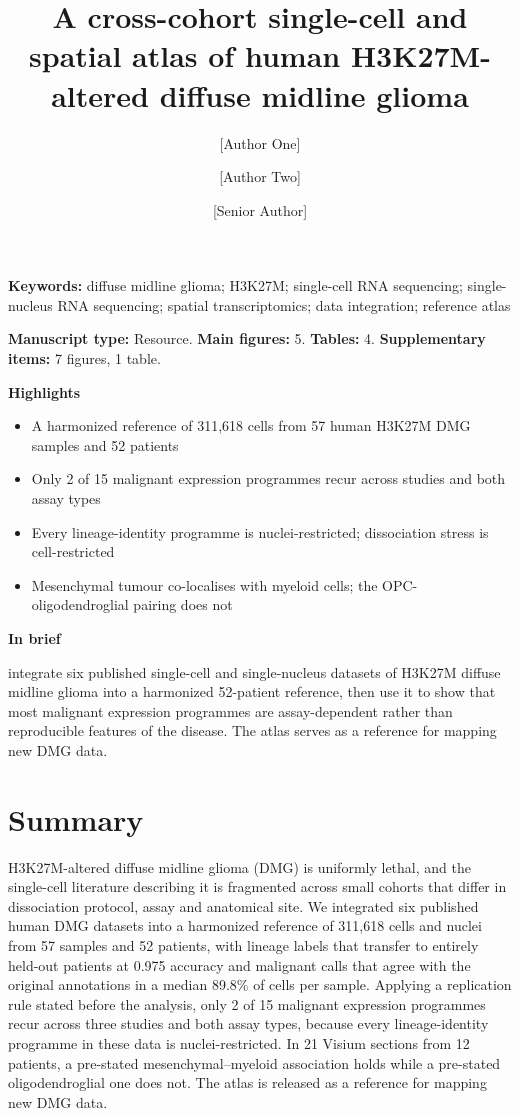 \documentclass[12pt,a4paper]{article}
\title{\bfseries A cross-cohort single-cell and spatial atlas of human H3K27M-altered diffuse midline glioma}
\author[1]{[Author One]}
\author[1,2]{[Author Two]}
\author[1,*]{[Senior Author]}
\affil[1]{[Department, Institution, City, Country]}
\affil[2]{[Second affiliation]}
\affil[*]{Correspondence: [email]}
\date{}
\begin{document}
\sloppy
\maketitle
\thispagestyle{empty}

\noindent\textbf{Keywords:} diffuse midline glioma; H3K27M; single-cell RNA sequencing; single-nucleus RNA
sequencing; spatial transcriptomics; data integration; reference atlas

\vspace{1em}
\noindent\textbf{Manuscript type:} Resource. \quad \textbf{Main figures:} 5. \quad \textbf{Tables:} 4. \quad
\textbf{Supplementary items:} 7 figures, 1 table.

\vspace{1.2em}
\noindent\textbf{Highlights}
\begin{itemize}\setlength\itemsep{0.1em}
  \item A harmonized reference of 311,618 cells from 57 human H3K27M DMG samples and 52 patients
  \item Only 2 of 15 malignant expression programmes recur across studies and both assay types
  \item Every lineage-identity programme is nuclei-restricted; dissociation stress is cell-restricted
  \item Mesenchymal tumour co-localises with myeloid cells; the OPC-oligodendroglial pairing does not
\end{itemize}

\vspace{0.6em}
\noindent\textbf{In brief}

\noindent [Authors] integrate six published single-cell and single-nucleus datasets of H3K27M diffuse midline
glioma into a harmonized 52-patient reference, then use it to show that most malignant expression programmes are
assay-dependent rather than reproducible features of the disease. The atlas serves as a reference for mapping new
DMG data.

\newpage
\doublespacing
\linenumbers

\section{Summary}

H3K27M-altered diffuse midline glioma (DMG) is uniformly lethal, and the single-cell literature describing it is
fragmented across small cohorts that differ in dissociation protocol, assay and anatomical site. We integrated six
published human DMG datasets into a harmonized reference of 311,618 cells and nuclei from 57 samples and 52
patients, with lineage labels that transfer to entirely held-out patients at 0.975 accuracy and malignant calls
that agree with the original annotations in a median 89.8\% of cells per sample. Applying a replication rule
stated before the analysis, only 2 of 15 malignant expression programmes recur across three studies and both assay
types, because every lineage-identity programme in these data is nuclei-restricted. In 21 Visium sections from 12
patients, a pre-stated mesenchymal--myeloid association holds while a pre-stated oligodendroglial one does not.
The atlas is released as a reference for mapping new DMG data.
\end{document}
